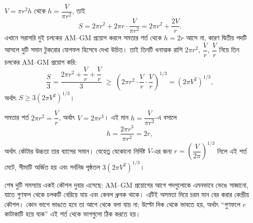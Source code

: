 \documentclass[11pt]{article}
\begin{document}
\begin{sol}
$V = \pi r^2 h$ থেকে $h = \dfrac{V}{\pi r^2}$, তাই
\[
  S = 2\pi r^2 + 2\pi r \cdot \frac{V}{\pi r^2} = 2\pi r^2 + \frac{2V}{r} .
\]
এখানে সরাসরি দুই চলকের AM--GM প্রয়োগ করলে সমতার শর্ত থেকে $h = 2r$ আসে না, কারণ
দ্বিতীয় পদটি আসলে দুটি সমান টুকরোর যোগফল হিসেবে দেখা উচিত। তাই তিনটি ধনাত্মক
রাশি $2\pi r^2$, $\dfrac{V}{r}$, $\dfrac{V}{r}$ নিয়ে তিন চলকের AM--GM প্রয়োগ
করি:
\[
  \frac{S}{3} = \frac{2\pi r^2 + \dfrac{V}{r} + \dfrac{V}{r}}{3}
  \;\geq\; \left( 2\pi r^2 \cdot \frac{V}{r} \cdot \frac{V}{r} \right)^{1/3}
  = \left( 2\pi V^2 \right)^{1/3} ,
\]
অর্থাৎ $S \geq 3 \left( 2\pi V^2 \right)^{1/3}$।

সমতার শর্ত $2\pi r^2 = \dfrac{V}{r}$, অর্থাৎ $V = 2\pi r^3$। এই মান
$h = \dfrac{V}{\pi r^2}$-এ বসালে
\[
  h = \frac{2\pi r^3}{\pi r^2} = 2r ,
\]
অর্থাৎ কৌটার উচ্চতা তার ব্যাসের সমান। যেহেতু যেকোনো নির্দিষ্ট $V$-এর জন্য
$r = \left( \dfrac{V}{2\pi} \right)^{1/3}$ নিলে এই শর্ত মেটে, সীমাটি অর্জিত হয়
এবং সর্বনিম্ন পৃষ্ঠতল $3 \left( 2\pi V^2 \right)^{1/3}$।
\end{sol}

\begin{remark}
শেষ দুটি সমস্যায় একই কৌশল দুবার এসেছে: AM--GM প্রয়োগের আগে পদগুলোকে এমনভাবে
ভেঙে সাজানো, যাতে গুণফল থেকে চলকটি বেরিয়ে যায় এবং কেবল ধ্রুবক থাকে। এটিই
অসমতা দিয়ে চরম মান বের করার কেন্দ্রীয় কৌশল। কোন ভাগে ভাঙতে হবে তা আগে থেকে বলা
যায় না; উল্টো দিক থেকে ভাবতে হয়, অর্থাৎ ``গুণফলে $r$ কাটাকাটি হয়ে যাক'' এই
শর্ত থেকে ভাগগুলো ঠিক করতে হয়।
\end{remark}
\end{document}
